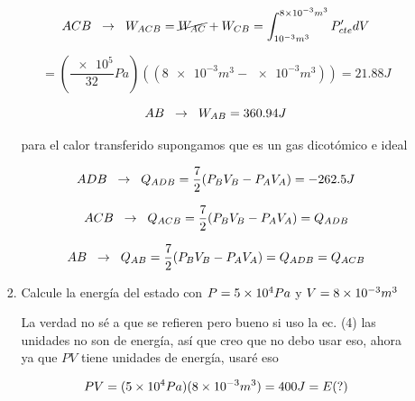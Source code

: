 \documentclass[12pt,a4paper]{article}
\begin{document}
\begin{enumerate}
\begin{enumerate}
\begin{enumerate}
            \begin{equation*}
                ACB \hspace{0.2cm} \rightarrow  \hspace{0.2cm} W_{ACB} = \cancel{W_{AC}} + W_{CB} =  \int_{\num{e-3}m^3}^{\num{8e-3}m^3} P'_{cte} dV
            \end{equation*}
            
            \begin{equation*}
                 = (\frac{\num{e5}}{32}Pa) ((\num{8e-3}m^3 - \num{e-3}m^3)) = 21.88 J
            \end{equation*}
            
            \begin{equation*}
                AB \hspace{0.2cm} \rightarrow  \hspace{0.2cm} W_{AB} = 360.94 J
            \end{equation*}
            
             para el calor transferido supongamos que es un gas dicotómico e ideal
             
             \begin{equation*}
                 ADB \hspace{0.2cm} \rightarrow  \hspace{0.2cm} Q_{ADB} = \frac{7}{2} (P_{B}V_{B} - P_{A} V_{A}) = -262.5 J 
             \end{equation*}
             
             \begin{equation*}
                 ACB \hspace{0.2cm} \rightarrow  \hspace{0.2cm} Q_{ACB} = \frac{7}{2} (P_{B}V_{B} - P_{A} V_{A}) = Q_{ADB}
             \end{equation*}
             
             \begin{equation*}
                 AB \hspace{0.2cm} \rightarrow  \hspace{0.2cm} Q_{AB} = \frac{7}{2} (P_{B}V_{B} - P_{A} V_{A}) = Q_{ADB} = Q_{ACB}
             \end{equation*}
             
            
            \item Calcule la energía del estado con $P=\num{5 e 4}Pa$ y $V = \num{8 e -3}m^3$
            
            La verdad no sé a que se refieren pero bueno si uso la ec. (4) las unidades no son de energía, así que creo que no debo usar eso, ahora ya que $PV$ tiene unidades de energía, usaré eso
            
            \begin{equation*}
                P V = (\num{5 e 4}Pa)(\num{8 e -3}m^3) = 400 J = E(?)
            \end{equation*}
        \end{enumerate}
    \end{enumerate}
\end{enumerate}
\end{document}
